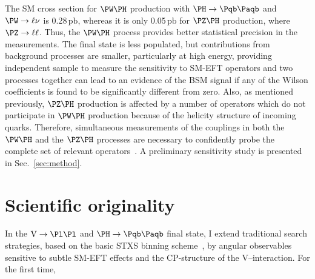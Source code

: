 \documentclass[a4paper,11pt]{article}
\newcommand{\Pb}{{{\Pqb}}\xspace}
\newcommand{\PAb}{{{{\Paqb}}}\xspace}
\renewcommand{\PV}{{{{V}}}\xspace}
\newcommand{\pb} {\mbox{\ensuremath{\,\text{pb}}}\xspace}
\begin{document}
The SM cross section for $\PW\PH$ production with  $\PH\rightarrow\Pb\PAb$ and $\PW\rightarrow\ell\nu$  is 0.28\pb, whereas it is only 0.05\pb for $\PZ\PH$ production, where $\PZ\rightarrow\ell\ell$.
Thus, the $\PW\PH$ process provides better statistical precision in the measurements. 
The \PZ final state is less populated, 
but contributions from background processes are smaller, 
particularly at high energy, 
providing independent sample to measure the sensitivity to SM-EFT operators and 
two processes together can lead to an evidence of the BSM signal if any of the Wilson coefficients is found to be significantly different from zero.
Also, as mentioned previously, $\PZ\PH$ production is affected by a number of operators which do not participate in $\PW\PH$ production because of the helicity structure of incoming quarks.
Therefore, simultaneous measurements of the couplings in both the $\PW\PH$ and the $\PZ\PH$ processes are necessary to confidently probe the complete set of relevant operators~\cite{Banerjee:2019twi}.
A preliminary sensitivity study is presented in Sec.~\ref{sec:method}. 

\section{Scientific originality}

In the $\textrm{\PV}\rightarrow\Pl\Pl$ and $\PH\rightarrow\Pb\PAb$ final state, I extend traditional search strategies, based on the basic STXS binning scheme~\cite{Berger:2019wnu}, by angular observables sensitive to subtle SM-EFT effects and the CP-structure of the \PV--\PH interaction. For the first time,

\end{document}
